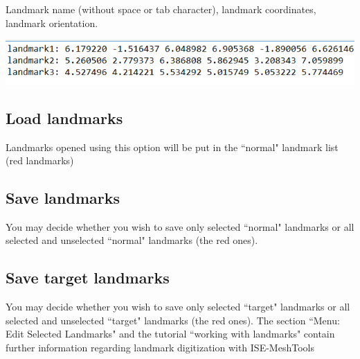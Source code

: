 \begin{minipage}{0.5\textwidth}
Landmark name (without space or tab character), landmark coordinates, landmark orientation.
\end{minipage}  
 \begin{minipage}{0.4\textwidth}\centering
  \includegraphics[scale=0.3]{images/Landmarks/VER_file.png}
 \end{minipage} 


\subsection{Load landmarks}
Landmarks opened using this option will be put in the ``normal" landmark list (red landmarks)
\subsection{Save landmarks}
You may decide whether you wish to save only selected ``normal" landmarks or all selected and
unselected ``normal" landmarks (the red ones).
\subsection{Save target landmarks}

You may decide whether you wish to save only selected ``target" landmarks or all selected and
unselected ``target" landmarks (the red ones).
The section ``Menu: Edit Selected Landmarks" and the tutorial ``working with landmarks" contain
further information regarding landmark digitization with ISE-MeshTools

